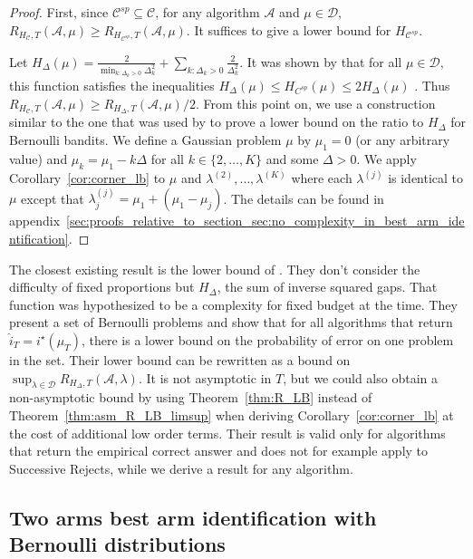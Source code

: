 \documentclass{article}
\begin{document}
\begin{proof}
First, since $\mathcal C^{sp} \subseteq \mathcal C$, for any algorithm $\mathcal A$ and $\mu \in \mathcal D$, $R_{H_{\mathcal C}, T}(\mathcal A, \mu) \ge R_{H_{\mathcal C^{sp}}, T}(\mathcal A, \mu)$. It suffices to give a lower bound for $H_{\mathcal C^{sp}}$.

Let $H_{\Delta}(\mu) = \frac{2}{\min_{k : \Delta_k>0} \Delta_k^2} + \sum_{k:\Delta_k>0} \frac{2}{\Delta_k^2}$. It was shown by \cite{garivier2016optimal} that for all $\mu \in \mathcal D$, this function satisfies the inequalities $H_\Delta(\mu) \le H_{C^{sp}}(\mu) \le 2 H_\Delta(\mu)$ .
Thus $R_{H_{\mathcal C}, T}(\mathcal A, \mu) \ge R_{H_\Delta, T}(\mathcal A, \mu) / 2$. From this point on, we use a construction similar to the one that was used by \cite{carpentier2016tight} to prove a lower bound on the ratio to $H_\Delta$ for Bernoulli bandits.
We define a Gaussian problem $\mu$ by $\mu_1 = 0$ (or any arbitrary value) and $\mu_k = \mu_1 - k \Delta$ for all $k \in \{2, \ldots, K\}$ and some $\Delta > 0$.
We apply Corollary~\ref{cor:corner_lb} to $\mu$ and $\lambda^{(2)}, \ldots, \lambda^{(K)}$ where each $\lambda^{(j)}$ is identical to $\mu$ except that $\lambda^{(j)}_j = \mu_1 + (\mu_1 - \mu_j)$. The details can be found in appendix~\ref{sec:proofs_relative_to_section_sec:no_complexity_in_best_arm_identification}.
\end{proof}

The closest existing result is the lower bound of \cite{carpentier2016tight}.
They don't consider the difficulty of fixed proportions but $H_\Delta$, the sum of inverse squared gaps.
That function was hypothesized to be a complexity for fixed budget at the time. They present a set of Bernoulli problems and show that for all algorithms that return $\hat{i}_T = i^\star(\hat{\mu}_T)$, there is a lower bound on the probability of error on one problem in the set.
Their lower bound can be rewritten as a bound on $\sup_{\lambda \in \mathcal D} R_{H_\Delta,T}(\mathcal A, \lambda)$.
It is not asymptotic in $T$, but we could also obtain a non-asymptotic bound by using Theorem~\ref{thm:R_LB} instead of Theorem~\ref{thm:asm_R_LB_limsup} when deriving Corollary~\ref{cor:corner_lb} at the cost of additional low order terms.
Their result is valid only for algorithms that return the empirical correct answer and does not for example apply to Successive Rejects, while we derive a result for any algorithm.


\subsection{Two arms best arm identification with Bernoulli distributions}
\label{sub:two_arms}
\end{document}

